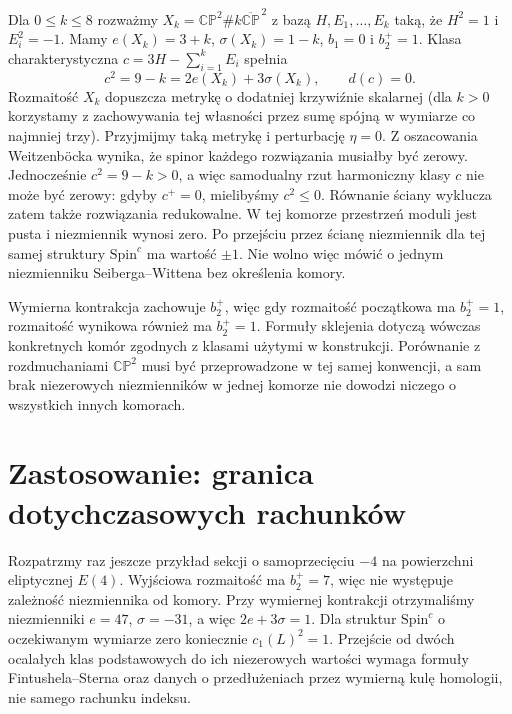 \begin{przyklad}
Dla $0\leq k\leq8$ rozważmy
$X_k=\mathbb{CP}^2\#k\overline{\mathbb{CP}}^{\,2}$
z bazą $H,E_1,\ldots,E_k$ taką, że $H^2=1$ i $E_i^2=-1$.
Mamy $e(X_k)=3+k$, $\sigma(X_k)=1-k$, $b_1=0$ i $b_2^+=1$.
Klasa charakterystyczna $c=3H-\sum_{i=1}^kE_i$ spełnia
\[
c^2=9-k=2e(X_k)+3\sigma(X_k),\qquad d(c)=0.
\]
Rozmaitość $X_k$ dopuszcza metrykę o dodatniej krzywiźnie
skalarnej (dla $k>0$ korzystamy z zachowywania tej własności
przez sumę spójną w wymiarze co najmniej trzy).
Przyjmijmy taką metrykę i perturbację $\eta=0$.
Z oszacowania Weitzenböcka wynika, że spinor każdego
rozwiązania musiałby być zerowy. Jednocześnie $c^2=9-k>0$,
a więc samodualny rzut harmoniczny klasy $c$ nie może
być zerowy: gdyby $c^+=0$, mielibyśmy $c^2\leq0$.
Równanie ściany wyklucza zatem także rozwiązania
redukowalne. W tej komorze przestrzeń moduli jest pusta
i niezmiennik wynosi zero. Po przejściu przez ścianę
niezmiennik dla tej samej struktury $\mathrm{Spin}^c$
ma wartość $\pm1$. Nie wolno więc mówić o jednym
niezmienniku Seiberga--Wittena bez określenia komory.
\end{przyklad}

\begin{uwaga}
Wymierna kontrakcja zachowuje $b_2^+$, więc gdy rozmaitość
początkowa ma $b_2^+=1$, rozmaitość wynikowa również ma
$b_2^+=1$. Formuły sklejenia dotyczą wówczas konkretnych
komór zgodnych z klasami użytymi w konstrukcji.
Porównanie z rozdmuchaniami $\mathbb{CP}^2$ musi być
przeprowadzone w tej samej konwencji, a sam brak niezerowych
niezmienników w jednej komorze nie dowodzi niczego
o wszystkich innych komorach.
\end{uwaga}

\section{Zastosowanie: granica dotychczasowych rachunków}
\label{sec:tg-sw-what-next}

Rozpatrzmy raz jeszcze przykład sekcji o samoprzecięciu
$-4$ na powierzchni eliptycznej $E(4)$. Wyjściowa rozmaitość
ma $b_2^+=7$, więc nie występuje zależność niezmiennika od komory.
Przy wymiernej kontrakcji otrzymaliśmy niezmienniki
$e=47$, $\sigma=-31$, a więc $2e+3\sigma=1$.
Dla struktur $\mathrm{Spin}^c$ o oczekiwanym wymiarze zero
koniecznie $c_1(L)^2=1$. Przejście od dwóch ocalałych
klas podstawowych do ich niezerowych wartości wymaga
formuły Fintushela--Sterna oraz danych o przedłużeniach
przez wymierną kulę homologii, nie samego rachunku indeksu.

